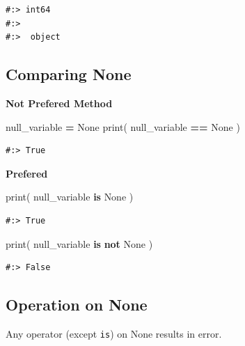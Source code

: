 \documentclass[
]{book}
\newenvironment{Shaded}{\begin{snugshade}}{\end{snugshade}}
\newcommand{\BuiltInTok}[1]{#1}
\newcommand{\KeywordTok}[1]{\textcolor[rgb]{0.27,0.27,0.27}{\textbf{#1}}}
\newcommand{\NormalTok}[1]{#1}
\newcommand{\OperatorTok}[1]{\textcolor[rgb]{0.43,0.43,0.43}{\textbf{#1}}}
\newcommand{\VariableTok}[1]{\textcolor[rgb]{0,0,0}{#1}}
\begin{document}
\begin{verbatim}
#:> int64 
#:> 
#:>  object
\end{verbatim}

\hypertarget{comparing-none}{%
\subsection{Comparing None}\label{comparing-none}}

\textbf{Not Prefered Method}

\begin{Shaded}
\begin{Highlighting}[]
\NormalTok{null_variable }\OperatorTok{=} \VariableTok{None}
\BuiltInTok{print}\NormalTok{( null_variable }\OperatorTok{==} \VariableTok{None}\NormalTok{ )}
\end{Highlighting}
\end{Shaded}

\begin{verbatim}
#:> True
\end{verbatim}

\textbf{Prefered}

\begin{Shaded}
\begin{Highlighting}[]
\BuiltInTok{print}\NormalTok{( null_variable }\KeywordTok{is} \VariableTok{None}\NormalTok{ )}
\end{Highlighting}
\end{Shaded}

\begin{verbatim}
#:> True
\end{verbatim}

\begin{Shaded}
\begin{Highlighting}[]
\BuiltInTok{print}\NormalTok{( null_variable }\KeywordTok{is} \KeywordTok{not} \VariableTok{None}\NormalTok{ )}
\end{Highlighting}
\end{Shaded}

\begin{verbatim}
#:> False
\end{verbatim}

\hypertarget{operation-on-none}{%
\subsection{Operation on None}\label{operation-on-none}}

Any operator (except \texttt{is}) on None results in error.
\end{document}
